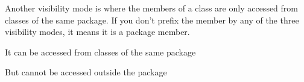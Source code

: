 \documentclass{KodeBook}
\begin{document}
Another visibility mode is  where the members of a class are only accessed from classes of the same package. 
If you don't prefix the member by any of the three visibility modes, it means it is a package member.



It can be accessed from classes of the same package



But cannot be accessed outside the package



%
%
%
%
%
%
%
%
%
%
%
%
%
%
%
%
%
%
%


\ifx\wholebook\relax\else
% 
% 
	
\end{document}
